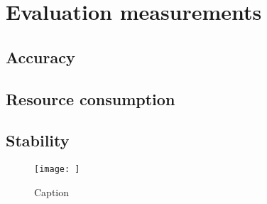 \chapter{Evaluation measurements}
\section{Accuracy}
\section{Resource consumption}
\section{Stability}
\begin{figure}
    \centering
    \texttt{[image: ]}
    \caption{Caption}
    \label{fig:my_label}
\end{figure}